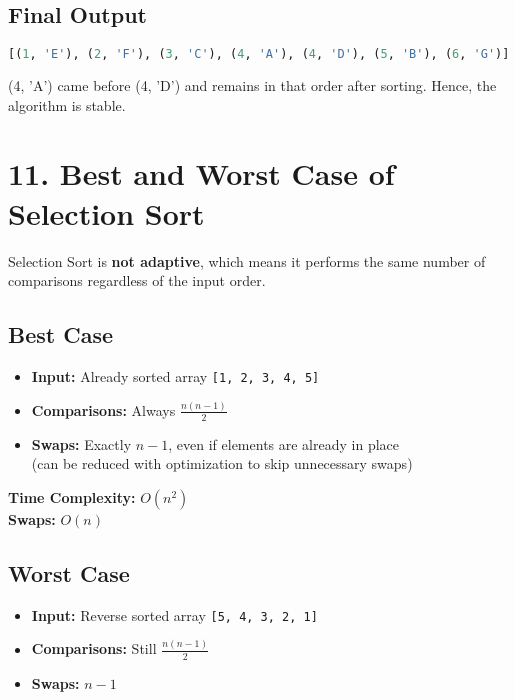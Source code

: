\documentclass[14pt]{extarticle}
\begin{document}
\subsection*{Final Output}
\begin{lstlisting}[language=Python]
[(1, 'E'), (2, 'F'), (3, 'C'), (4, 'A'), (4, 'D'), (5, 'B'), (6, 'G')]
\end{lstlisting}

\begin{tcolorbox}[colback=white, colframe=black, title=Stability Observed]
(4, 'A') came before (4, 'D') and remains in that order after sorting. Hence, the algorithm is stable.
\end{tcolorbox}

\newpage
\section*{11. Best and Worst Case of Selection Sort}

Selection Sort is \textbf{not adaptive}, which means it performs the same number of comparisons regardless of the input order.

\subsection*{Best Case}
\begin{itemize}
    \item \textbf{Input:} Already sorted array \texttt{[1, 2, 3, 4, 5]}
    \item \textbf{Comparisons:} Always $\frac{n(n - 1)}{2}$
    \item \textbf{Swaps:} Exactly $n - 1$, even if elements are already in place \\
          (can be reduced with optimization to skip unnecessary swaps)
\end{itemize}

\textbf{Time Complexity:} $O(n^2)$ \\
\textbf{Swaps:} $O(n)$

\vspace{1em}

\subsection*{Worst Case}
\begin{itemize}
    \item \textbf{Input:} Reverse sorted array \texttt{[5, 4, 3, 2, 1]}
    \item \textbf{Comparisons:} Still $\frac{n(n - 1)}{2}$
    \item \textbf{Swaps:} $n - 1$
\end{itemize}
\end{document}
